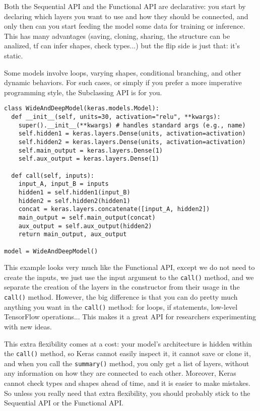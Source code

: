 \documentclass[french]{article}
\begin{document}
Both the Sequential API and the Functional API are declarative: you start by declaring which layers you want to use and how they should be connected, and only then can you start feeding the model some data for training or inference. This has many advantages (saving, cloning, sharing, the structure can be analized, tf can infer shapes, check types...) but the flip side is just that: it’s static.

Some models involve loops, varying shapes, conditional branching, and other dynamic behaviors. For such cases, or simply if you prefer a more imperative programming style, the Subclassing API is for you.

\begin{lstlisting}
class WideAndDeepModel(keras.models.Model):
  def __init__(self, units=30, activation="relu", **kwargs):
    super().__init__(**kwargs) # handles standard args (e.g., name)
    self.hidden1 = keras.layers.Dense(units, activation=activation)
    self.hidden2 = keras.layers.Dense(units, activation=activation)
    self.main_output = keras.layers.Dense(1)
    self.aux_output = keras.layers.Dense(1)

  def call(self, inputs):
    input_A, input_B = inputs
    hidden1 = self.hidden1(input_B)
    hidden2 = self.hidden2(hidden1)
    concat = keras.layers.concatenate([input_A, hidden2])
    main_output = self.main_output(concat)
    aux_output = self.aux_output(hidden2)
    return main_output, aux_output

model = WideAndDeepModel()
\end{lstlisting}

This example looks very much like the Functional API, except we do not need to create the inputs, we just use the input argument to the \lstinline{call()} method, and we separate the creation of the layers in the constructor from their usage in the \lstinline{call()} method.  However, the big difference is that you can do pretty much anything you want in the \lstinline{call()} method: for loops, if statements, low-level TensorFlow operations... This makes it a great API for researchers experimenting with new ideas.

This extra flexibility comes at a cost: your model’s architecture is hidden within the \lstinline{call()} method, so Keras cannot easily inspect it, it cannot save or clone it, and when you call the \lstinline{summary()} method, you only get a list of layers, without any information on how they are connected to each other. Moreover, Keras cannot check types and shapes ahead of time, and it is easier to make mistakes. So unless you really need that extra flexibility, you should probably stick to the Sequential API or the Functional API.
\end{document}
